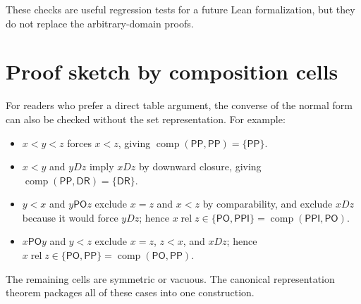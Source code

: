 \documentclass[11pt]{article}
\theoremstyle{definition}
\theoremstyle{remark}
\newcommand{\PP}{\mathsf{PP}}
\newcommand{\PPI}{\mathsf{PPI}}
\newcommand{\PO}{\mathsf{PO}}
\newcommand{\DR}{\mathsf{DR}}
\newcommand{\Rel}{\operatorname{rel}}
\begin{document}
These checks are useful regression tests for a future Lean formalization, but they do not replace the arbitrary-domain proofs.

\section{Proof sketch by composition cells}

For readers who prefer a direct table argument, the converse of the normal form can also be checked without the set representation.  For example:
\begin{itemize}[leftmargin=2em]
\item $x<y<z$ forces $x<z$, giving $\operatorname{comp}(\PP,\PP)=\{\PP\}$.
\item $x<y$ and $yDz$ imply $xDz$ by downward closure, giving $\operatorname{comp}(\PP,\DR)=\{\DR\}$.
\item $y<x$ and $y\PO z$ exclude $x=z$ and $x<z$ by comparability, and exclude $xDz$ because it would force $yDz$; hence $x\Rel z\in\{\PO,\PPI\}=\operatorname{comp}(\PPI,\PO)$.
\item $x\PO y$ and $y<z$ exclude $x=z$, $z<x$, and $xDz$; hence $x\Rel z\in\{\PO,\PP\}=\operatorname{comp}(\PO,\PP)$.
\end{itemize}
The remaining cells are symmetric or vacuous.  The canonical representation theorem packages all of these cases into one construction.
\end{document}
